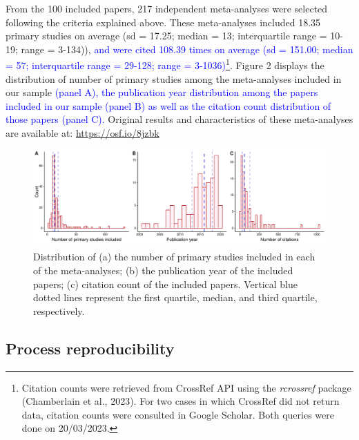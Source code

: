 \documentclass[
  ,man,floatsintext]{apa6}
\begin{document}
From the 100 included papers, 217 independent meta-analyses were selected following the criteria explained above. These meta-analyses included 18.35 primary studies on average (sd = 17.25; median = 13; interquartile range = 10-19; range = 3-134)), \textcolor{blue}{and were cited 108.39 times on average (sd = 151.00; median = 57; interquartile range = 29-128; range = 3-1036)}\footnote{Citation counts were retrieved from CrossRef API using the \emph{rcrossref} package (Chamberlain et al., 2023). For two cases in which CrossRef did not return data, citation counts were consulted in Google Scholar. Both queries were done on 20/03/2023.}.
Figure 2 displays the distribution of number of primary studies among the meta-analyses included in our sample \textcolor{blue}{(panel A), the publication year distribution among the papers included in our sample (panel B) as well as the citation count distribution of those papers (panel C).} Original results and characteristics of these meta-analyses are available at: \url{https://osf.io/8jzbk}

\begin{figure}
\centering
\includegraphics{submission_files/figure-latex/unnamed-chunk-1-1.pdf}
\caption{\label{fig:unnamed-chunk-1}Distribution of (a) the number of primary studies included in each of the meta-analyses; (b) the publication year of the included papers; (c) citation count of the included papers. Vertical blue dotted lines represent the first quartile, median, and third quartile, respectively.}
\end{figure}

\hypertarget{process-reproducibility}{%
\subsection{Process reproducibility}\label{process-reproducibility}}
\end{document}

